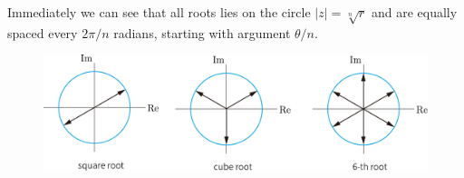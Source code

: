 \documentclass[UTF8]{ctexart}
\begin{document}
Immediately we can see that all roots lies on the circle $ |z| = \sqrt[n]{r} $ and are equally spaced every $ 2\pi / n $ radians, starting with argument $ \theta / n $.


\begin{figure}[H]
    \centering
    \includegraphics[width = 0.9\linewidth]{./pic/root_eg.pdf}
\end{figure}
\end{document}
